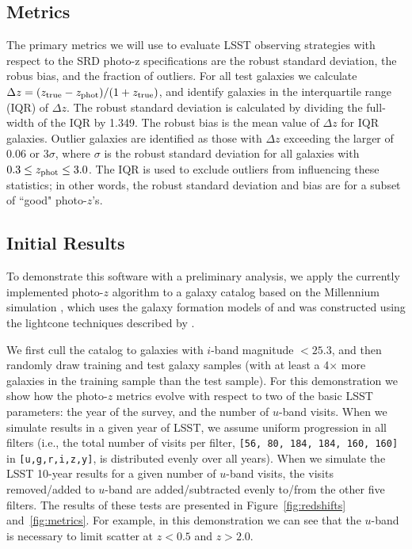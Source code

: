 \subsection{Metrics}

The primary metrics we will use to evaluate LSST
observing strategies with respect to the SRD photo-z specifications are the
robust standard deviation, the robus bias, and the fraction of outliers. For all test
galaxies we calculate $\Delta z = (z_{\rm true} - z_{\rm phot}) /
(1+z_{\rm true})$, and identify galaxies in the interquartile range (IQR) of $\Delta z$.
The robust standard deviation is calculated by dividing the full-width of the IQR by 1.349.
The robust bias is the mean value of $\Delta z$ for IQR galaxies.
Outlier galaxies are identified as those with $\Delta z$ exceeding the larger of 0.06 or 3$\sigma$, 
where $\sigma$ is the robust standard deviation for all galaxies with $0.3 \leq z_{\rm phot} \leq 3.0$.
The IQR is used to exclude outliers from influencing these statistics; in other words, the robust
standard deviation and bias are for a subset of ``good" photo-$z$'s.

\subsection{Initial Results}

To demonstrate this software with a
preliminary analysis, we apply the currently implemented photo-$z$
algorithm to a galaxy catalog based on the Millennium simulation \citep{2005Natur.435..629S}, which uses the galaxy formation models of \citep{2014MNRAS.439..264G} and was constructed using the lightcone techniques described by \cite{2013MNRAS.429..556M}.

We first cull the catalog
to galaxies with $i$-band magnitude $<25.3$, and then randomly draw
training and test galaxy samples (with at least a 4$\times$ more
galaxies in the training sample than the test sample). For this
demonstration we show how the photo-$z$ metrics evolve with respect to
two of the basic LSST parameters: the year of the survey, and the number
of $u$-band visits. When we simulate results in a given year of LSST, we
assume uniform progression in all filters (i.e., the total number of
visits per filter, \texttt{[56, 80, 184, 184, 160, 160]} in
\texttt{[u,g,r,i,z,y]}, is distributed evenly over all years). When we
simulate the LSST 10-year results for a given number of $u$-band visits,
the visits removed/added to $u$-band are added/subtracted evenly to/from
the other five filters. The results of these tests are presented in
Figure~\ref{fig:redshifts} and~\ref{fig:metrics}. For example, in this
demonstration we can see that the $u$-band is necessary to limit scatter
at $z<0.5$ and $z>2.0$.

